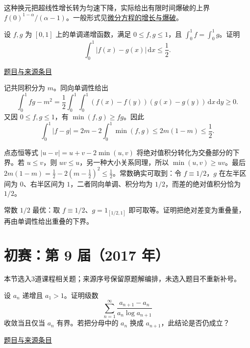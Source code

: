 \documentclass[12pt,fontset=fandol]{ctexart}
\begin{document}
\begin{remark}[方法与条件]这种换元把超线性增长转为匀速下降，实际给出有限时间爆破的上界 $f(0)^{1-\alpha}/(\alpha-1)$。一般形式见\hyperref[app:dynamics-blowup]{微分方程的增长与爆破}。\end{remark}

\begin{example}[来源序号6]\label{ex:pre08-math:6}\label{pr:pre08-math:6}

设 $f,g$ 为 $[0,1]$ 上的单调递增函数，满足 $0\le f,g\le1$，且 $\int_0^1f=\int_0^1g$。证明
\[
\int_0^1|f(x)-g(x)|\,\mathrm dx\le\frac12.
\]

\par\href{https://github.com/lzxcr/cmc-mathematics/blob/64916fa1fdbc3e444a652eca204d5669058ee321/src/problems/preliminary/08/06.md}{题目与来源条目}

\end{example}

\begin{solve}\label{ans:pre08-math:6}

记共同积分为 $m$。同向单调性给出
\[
\int_0^1fg-m^2
=\frac12\int_0^1\!\int_0^1(f(x)-f(y))(g(x)-g(y))\,\mathrm dx\,\mathrm dy\ge0.
\]
又因 $0\le f,g\le1$，有 $\min(f,g)\ge fg$。因此
\[
\int_0^1|f-g|=2m-2\int_0^1\min(f,g)
\le2m(1-m)\le\frac12.
\]

点态恒等式 $|u-v|=u+v-2\min(u,v)$ 将绝对值积分转化为交叠部分的下界。若 $u\le v$，则 $uv\le u$，另一种大小关系同理，所以 $\min(u,v)\ge uv$。最后 $2m(1-m)=\tfrac12-2(m-\tfrac12)^2\le\tfrac12$。常数确实可取到：令 $f\equiv1/2$，$g$ 在左半区间为 $0$、右半区间为 $1$，二者同向单调、积分均为 $1/2$，而差的绝对值积分恰为 $1/2$。

\end{solve}

\begin{remark}[方法与条件]常数 $1/2$ 最优：取 $f\equiv1/2$、$g=1_{[1/2,1]}$ 即可取等。证明把绝对差变为重叠量，再由单调性给出重叠的下界。\end{remark}

\section{初赛：第 9 届（2017 年）}

本节选入3道课程相关题；来源序号保留原题解编排，未选入题目不重新补号。

\begin{example}[来源序号2]\label{ex:pre09-math:2}\label{pr:pre09-math:2}

设 $a_n$ 递增且 $a_1>1$。证明级数
\[
\sum_{n=1}^\infty\frac{a_{n+1}-a_n}{a_n\log a_{n+1}}
\]
收敛当且仅当 $a_n$ 有界。若把分母中的 $a_n$ 换成 $a_{n+1}$，此结论是否仍成立？

\par\href{https://github.com/lzxcr/cmc-mathematics/blob/64916fa1fdbc3e444a652eca204d5669058ee321/src/problems/preliminary/09/02.md}{题目与来源条目}

\end{example}
\end{document}
